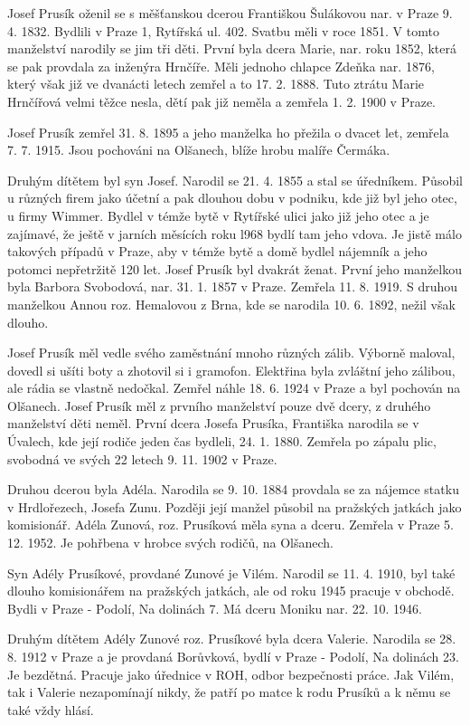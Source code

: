 \documentclass[../dejiny-rodu-prusiku.tex]{subfiles}
\begin{document}
Josef Prusík oženil se s měšťanskou dcerou Františkou Šulákovou nar. v Praze 9. 4. 1832. Bydlili v Praze 1, Rytířská ul. 402. Svatbu měli v roce 1851. V tomto manžel­ství narodily se jim tři děti. První byla dcera Marie, nar. roku 1852, která se pak provdala za inženýra Hrnčí­ře. Měli jednoho chlapce Zdeňka nar. 1876, který však již ve dvanácti letech zemřel a to 17. 2. 1888. Tuto ztrátu Marie Hrnčířová velmi těžce nesla, dětí pak již nemě­la a zemřela 1. 2. 1900 v Praze.

Josef Prusík zemřel 31. 8. 1895 a jeho manželka ho přeži­la o dvacet let, zemřela 7. 7. 1915. Jsou pochováni na Olšanech, blíže hrobu malíře Čermáka.

Druhým dítětem byl syn Josef. Narodil se 21. 4. 1855 a stal se úředníkem. Působil u různých firem jako účetní a pak dlouhou dobu v podniku, kde již byl jeho otec, u firmy Wimmer. Bydlel v témže bytě v Rytířské ulici jako již jeho otec a je zajímavé, že ještě v jarních měsících roku l968 bydlí tam jeho vdova. Je jistě málo ta­kových případů v Praze, aby v témže bytě a domě bydlel nájemník a jeho potomci nepřetržitě 120 let. Josef Prusík byl dvakrát ženat. První jeho manželkou byla Barbora Svobodová, nar. 31. 1. 1857 v Praze. Zemřela 11. 8. 1919. S druhou manželkou Annou roz. Hemalovou z Brna, kde se narodila 10. 6. 1892, nežil však dlouho.

Josef Prusík měl vedle svého zaměstnání mnoho různých zálib. Výborně maloval, dovedl si ušíti boty a zhotovil si i gramofon. Elektřina byla zvláštní jeho zálibou, ale rádia se vlastně nedočkal. Zemřel náhle 18. 6. 1924 v Praze a byl pochován na Olšanech. Josef Prusík měl z prvního manželství pouze dvě dcery, z druhého manželství děti neměl.
První dcera Josefa Prusíka, Františka narodila se v Úvalech, kde její rodiče jeden čas bydleli, 24. 1.  1880.
Zemřela po zápalu plic, svobodná ve svých 22 letech 9. 11. 1902 v Praze.

Druhou dcerou byla Adéla. Narodila se 9. 10. 1884 provdala se za nájemce statku v Hrdlořezech, Josefa Zunu. Později její manžel působil na pražských jatkách jako komisionář. Adéla Zunová, roz. Prusíková měla syna a dceru. Zemřela v Praze 5. 12. 1952. Je pohřbena v hrobce svých rodičů, na Olšanech.

Syn Adély Prusíkové, provdané Zunové je Vilém. Narodil se 11. 4. 1910, byl také dlouho komisionářem na pražských jatkách, ale od roku 1945 pracuje v obchodě. Bydli v Praze - Podolí, Na dolinách 7. Má dceru Moniku nar. 22. 10. 1946.

Druhým dítětem Adély Zunové roz. Prusíkové byla dcera Valerie. Narodila se 28. 8. 1912 v Praze a je provdaná Borůvková, bydlí v Praze - Podolí, Na dolinách 23. Je bezdětná. Pracuje jako úřednice v ROH, odbor bezpečnosti práce. Jak Vilém, tak i Valerie nezapomínají nikdy, že patří po matce k rodu Prusíků a k němu se také vždy hlásí.
\end{document}
